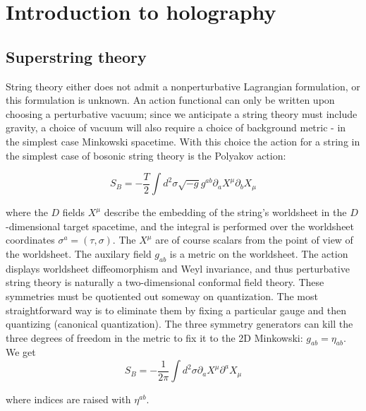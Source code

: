 \documentclass[11pt,a4paper,twoside,openright]{book}
\author{Riccardo Antonelli}
\begin{document}
\frontmatter

\tableofcontents

\mainmatter

\chapter{Introduction to holography}

\section{Superstring theory}

String theory either does not admit a nonperturbative Lagrangian formulation, or this formulation is unknown. An action functional can only be written upon choosing a perturbative vacuum; since we anticipate a string theory must include gravity, a choice of vacuum will also require a choice of background metric - in the simplest case Minkowski spacetime. With this choice the action for a string in the simplest case of bosonic string theory is the Polyakov action:

\begin{equation}
	S_B = -\frac{T}{2} \int d^2\sigma \sqrt{-g} g^{ab} \partial_a X^\mu \partial_b X_\mu
\end{equation}

where the $D$ fields $X^\mu$ describe the embedding of the string's worldsheet in the $D$-dimensional target spacetime, and the integral is performed over the worldsheet coordinates $\sigma^a = (\tau,\sigma)$. The $X^\mu$ are of course scalars from the point of view of the worldsheet. The auxilary field $g_{ab}$ is a metric on the worldsheet. The action displays worldsheet diffeomorphism and Weyl invariance, and thus perturbative string theory is naturally a two-dimensional conformal field theory. These symmetries must be quotiented out someway on quantization. The most straightforward way is to eliminate them by fixing a particular gauge and then quantizing (canonical quantization). The three symmetry generators can kill the three degrees of freedom in the metric to fix it to the 2D Minkowski: $g_{ab} = \eta_{ab}$. We get\\

\begin{equation}
	S_B = - \frac{1}{2\pi} \int d^2\sigma \partial_a X^\mu \partial^a X_\mu
\end{equation}

where indices are raised with $\eta^{ab}$.\\
\end{document}
